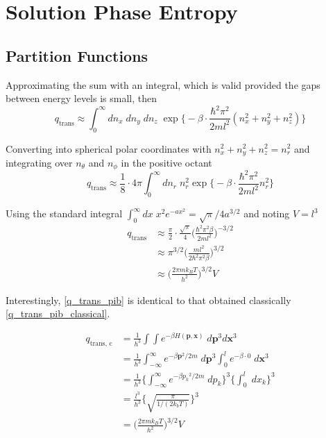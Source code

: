 \documentclass[../main.tex]{subfiles}
\begin{document}
\section{Solution Phase Entropy}
\subsection{Partition Functions} \label{section::appendix_igm_partition_functions}

Approximating the sum with an integral, which is valid provided the gaps between energy levels is small, then
\begin{equation}
	q_\text{trans} \approx \int_0^\infty dn_x\;dn_y\;dn_z\; \exp{ {\Big \{} -{\beta}\cdot  \frac{\hbar^2 \pi^2}{2ml^2}(n_x^2 + n_y^2 + n_z^2)}{\Big \}}
\end{equation}

Converting into spherical polar coordinates with $n_x^2 + n_y^2 + n_z^2 = n_r^2$ and integrating over $n_\theta$ and $n_\phi$ in the positive octant
\begin{equation}
	q_\text{trans} \approx \frac{1}{8} \cdot 4\pi \int_0^\infty dn_r\; n_r^2\exp{ {\Big \{} -{\beta}\cdot  \frac{\hbar^2 \pi^2}{2ml^2}n_r^2}{\Big \}}
\end{equation}

Using the standard integral $\int_{0}^{\infty} dx\; x^2 e^{-ax^2} = \sqrt{\pi}/4a^{3/2}$ and noting $V = l^3$
\begin{equation}
	\begin{aligned}
		q_\text{trans} &\approx \frac{\pi}{2} \cdot \frac{\sqrt{\pi}}{4} {\Big (} \frac{\hbar^2 \pi^2\beta}{2ml^2} {\Big )}^{-3/2} \\
		&\approx \pi^{3/2} {\Big (} \frac{ml^2}{2\hbar^2 \pi^2\beta} {\Big )}^{3/2} \\
		&\approx {\Big (} \frac{2\pi m k_B T}{h^2} {\Big )}^{3/2} V 
		\label{q_trans_pib}
	\end{aligned}
\end{equation}

Interestingly, \eqref{q_trans_pib} is identical to that obtained classically \eqref{q_trans_pib_classical}.

\begin{equation}
	\begin{aligned}
		q_\text{trans, c} &= \frac{1}{h^{3}}\int\int e^{-\beta H(\boldsymbol{p}, \boldsymbol{x})} \; d\boldsymbol{p}^{3} d\boldsymbol{x}^{3} \\
		&= \frac{1}{h^{3}}\int_{-\infty}^\infty e^{-\beta \boldsymbol{p}^2/2m} \; d\boldsymbol{p}^{3} \int_0^l e^{-\beta \cdot 0} \;  d\boldsymbol{x}^{3} \\
		&= \frac{1}{h^{3}} {\Big \{}  \int_{-\infty}^\infty e^{-\beta {p_k}^2/2m} \; d{p_k} {\Big \}}^3 {\Big \{}  \int_0^l  \;  dx_k {\Big \}}^3 \\
		&= \frac{l^3}{h^{3}} {\Big \{}  \sqrt{\frac{\pi}{1/(2 k_b T)}} {\Big \}}^3 \\
		&={\Big (} \frac{2\pi m k_B T}{h^2} {\Big )}^{3/2} V 
		\label{q_trans_pib_classical}
	\end{aligned}
\end{equation}
\end{document}
